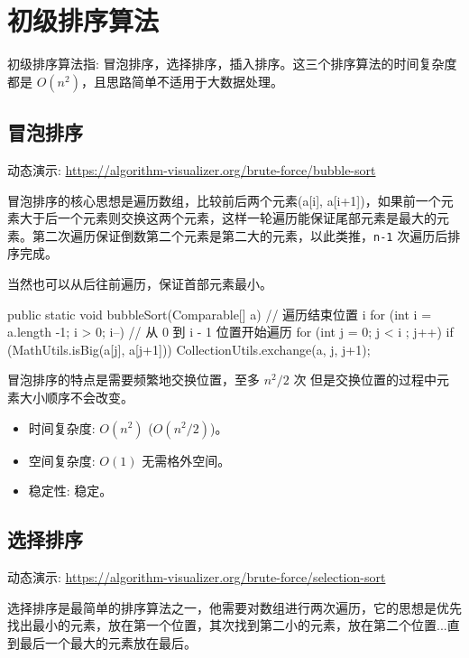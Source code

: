 \section{初级排序算法}

初级排序算法指: 冒泡排序，选择排序，插入排序。这三个排序算法的时间复杂度都是 $O(n^2)$，且思路简单不适用于大数据处理。

\subsection{冒泡排序}

动态演示: \url{https://algorithm-visualizer.org/brute-force/bubble-sort}

冒泡排序的核心思想是遍历数组，比较前后两个元素(a[i], a[i+1])，如果前一个元素大于后一个元素则交换这两个元素，这样一轮遍历能保证尾部元素是最大的元素。第二次遍历保证倒数第二个元素是第二大的元素，以此类推，\texttt{n-1} 次遍历后排序完成。

当然也可以从后往前遍历，保证首部元素最小。

\begin{Java}
public static void bubbleSort(Comparable[] a) {
    // 遍历结束位置 i
    for (int i = a.length -1; i > 0; i--) {
        // 从 0 到 i - 1 位置开始遍历
        for (int j = 0; j < i ; j++) {
            if (MathUtils.isBig(a[j], a[j+1]))
                CollectionUtils.exchange(a, j, j+1);
        }
    }
}
\end{Java}

冒泡排序的特点是需要频繁地交换位置，至多 $n^2/2$ 次 但是交换位置的过程中元素大小顺序不会改变。

\begin{itemize}
  \item 时间复杂度: $O(n^2)$ ($O(n^2/2)$)。
  \item 空间复杂度: $O(1)$ 无需格外空间。
  \item 稳定性: 稳定。
\end{itemize}

\subsection{选择排序}

动态演示: \url{https://algorithm-visualizer.org/brute-force/selection-sort}

选择排序是最简单的排序算法之一，他需要对数组进行两次遍历，它的思想是优先找出最小的元素，放在第一个位置，其次找到第二小的元素，放在第二个位置...直到最后一个最大的元素放在最后。

